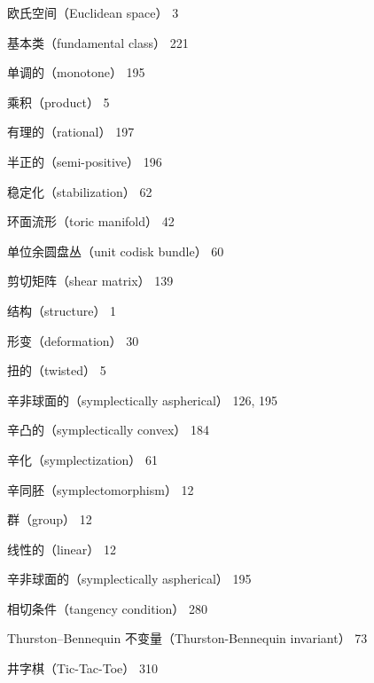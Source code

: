 {\noindent\hspace*{3em}欧氏空间（Euclidean space） 3\par
\noindent\hspace*{3em}基本类（fundamental class） 221\par
\noindent\hspace*{3em}单调的（monotone） 195\par
\noindent\hspace*{3em}乘积（product） 5\par
\noindent\hspace*{3em}有理的（rational） 197\par
\noindent\hspace*{3em}半正的（semi-positive） 196\par
\noindent\hspace*{3em}稳定化（stabilization） 62\par
\noindent\hspace*{3em}环面流形（toric manifold） 42\par
\noindent\hspace*{3em}单位余圆盘丛（unit codisk bundle） 60\par
\noindent 剪切矩阵（shear matrix） 139\par
\noindent\hspace*{1.5em}结构（structure） 1\par
\noindent\hspace*{3em}形变（deformation） 30\par
\noindent\hspace*{3em}扭的（twisted） 5\par
\noindent 辛非球面的（symplectically aspherical） 126, 195\par
\noindent 辛凸的（symplectically convex） 184\par
\noindent 辛化（symplectization） 61\par
\noindent 辛同胚（symplectomorphism） 12\par
\noindent\hspace*{1.5em}群（group） 12\par
\noindent\hspace*{1.5em}线性的（linear） 12\par
\noindent 辛非球面的（symplectically aspherical） 195\par
\noindent 相切条件（tangency condition） 280\par
\noindent Thurston–Bennequin 不变量（Thurston-Bennequin invariant） 73\par
\noindent 井字棋（Tic-Tac-Toe） 310\par
}
